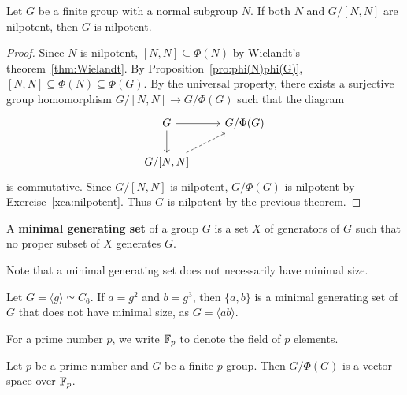 \begin{theorem}[Hall]
\label{thm:Hall_nilpotent}
Let $G$ be a finite group with a normal subgroup $N$. If both $N$ and 
$G/[N,N]$ are nilpotent, then $G$ is nilpotent.
\end{theorem}

\begin{proof}
Since $N$ is nilpotent, $[N,N]\subseteq\Phi(N)$ by 
Wielandt's theorem~\ref{thm:Wielandt}. 
By Proposition~\ref{pro:phi(N)phi(G)},
$[N,N]\subseteq\Phi(N)\subseteq\Phi(G)$. 
By the universal property, there exists a surjective group homomorphism 
$G/[N,N]\to G/\Phi(G)$ such that the diagram 
    \[
    \begin{tikzcd}
	G & {G/\Phi(G)} \\
	{G/[N,N]}
	\arrow[from=1-1, to=1-2]
	\arrow[from=1-1, to=2-1]
	\arrow[dashed, from=2-1, to=1-2]
    \end{tikzcd}
    \]
is commutative. Since $G/[N,N]$ is nilpotent, $G/\Phi(G)$ is nilpotent by 
Exercise~\ref{xca:nilpotent}. Thus $G$ is nilpotent by the previous theorem. 
\end{proof}

\begin{definition}
A \textbf{minimal generating set} of a group $G$ is a set 
$X$ of generators of $G$ such that no proper subset of $X$ generates $G$. 
\end{definition}

Note that a minimal generating set does not necessarily have minimal size. 
	
\begin{example}
Let $G=\langle g\rangle\simeq C_6$.  If $a=g^2$ and 
$b=g^3$, then $\{a,b\}$ is a minimal generating set of $G$ that does not have
minimal size, as $G=\langle ab\rangle$.
\end{example}
	
For a prime number $p$, we write $\mathbb{F}_p$ to denote the field of $p$ elements. 

\begin{lemma}
\label{lem:Burnside:minimal}
Let $p$ be a prime number and 
$G$ be a finite $p$-group. Then $G/\Phi(G)$ is a vector space over $\mathbb{F}_p$.
\end{lemma}

